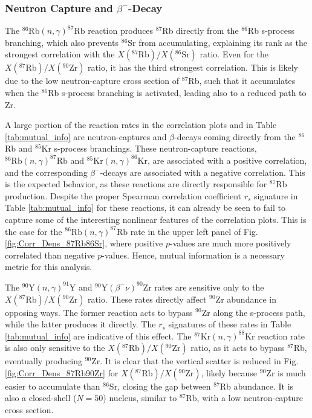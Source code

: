 \subsubsection{Neutron Capture and $\beta^{-}$-Decay}

The $^{86}\mathrm{Rb}(n,\gamma)^{87}\mathrm{Rb}$ reaction produces $^{87}$Rb directly from the $^{86}$Rb s-process branching, which also prevents $^{86}$Sr from accumulating, explaining its rank as the strongest correlation with the $X(^{87}\mathrm{Rb})/X(^{86}\mathrm{Sr})$ ratio. Even for the $X(^{87}\mathrm{Rb})/X(^{90}\mathrm{Zr})$ ratio, it has the third strongest correlation. This is likely due to the low neutron-capture cross section of $^{87}$Rb, such that it accumulates when the $^{86}$Rb s-process branching is activated, leading also to a reduced path to Zr.

A large portion of the reaction rates in the correlation plots and in Table \ref{tab:mutual_info} are neutron-captures and $\beta$-decays coming directly from the $^{86}$Rb and $^{85}$Kr s-process branchings. These neutron-capture reactions, $^{86}\mathrm{Rb}(n,\gamma)^{87}\mathrm{Rb}$ and $^{85}\mathrm{Kr}(n,\gamma)^{86}\mathrm{Kr}$, are associated with a positive correlation, and the corresponding $\beta^{-}$-decays are associated with a negative correlation. This is the expected behavior, as these reactions are directly responsible for $^{87}$Rb production. Despite the proper Spearman correlation coefficient $r_{s}$ signature in Table \ref{tab:mutual_info} for these reactions, it can already be seen to fail to capture some of the interesting nonlinear features of the correlation plots. This is the case for the $^{86}\mathrm{Rb}(n,\gamma)^{87}\mathrm{Rb}$ rate in the upper left panel of Fig. \ref{fig:Corr_Dens_87Rb86Sr}, where positive $p$-values are much more positively correlated than negative $p$-values. Hence, mutual information is a necessary metric for this analysis.

The $^{90}\mathrm{Y}(n,\gamma)^{91}\mathrm{Y}$ and $^{90}\mathrm{Y}(\beta^{-}\nu)^{90}\mathrm{Zr}$ rates are sensitive only to the $X(^{87}\mathrm{Rb})/X(^{90}\mathrm{Zr})$ ratio. These rates directly affect $^{90}$Zr abundance in opposing ways. The former reaction acts to bypass $^{90}$Zr along the s-process path, while the latter produces it directly. The $r_{s}$ signatures of these rates in Table \ref{tab:mutual_info} are indicative of this effect. The $^{87}\mathrm{Kr}(n,\gamma)^{88}\mathrm{Kr}$ reaction rate is also only sensitive to the $X(^{87}\mathrm{Rb})/X(^{90}\mathrm{Zr})$ ratio, as it acts to bypass $^{87}$Rb, eventually producing $^{90}$Zr. It is clear that the vertical scatter is reduced in Fig. \ref{fig:Corr_Dens_87Rb90Zr} for $X(^{87}\mathrm{Rb})/X(^{90}\mathrm{Zr})$, likely because $^{90}$Zr is much easier to accumulate than $^{86}$Sr, closing the gap between $^{87}$Rb abundance. It is also a closed-shell ($N=50$) nucleus, similar to $^{87}$Rb, with a low neutron-capture cross section.

